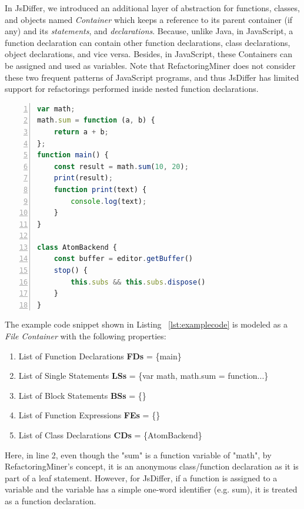 \documentclass[letterpaper,12pt,onecolumn,final]{report}
\begin{document}
In JsDiffer, we introduced an additional layer of abstraction for functions, classes, and objects named \textit{Container} which keeps a reference to its parent container (if any) and its \textit{statements}, and \textit{declarations}. Because, unlike Java, in JavaScript, a function declaration can contain other function declarations, class declarations, object declarations, and vice versa. Besides, in JavaScript, these Containers can be assigned and used as variables. Note that RefactoringMiner does not consider these two frequent patterns of JavaScript programs, and thus JsDiffer has limited support for refactorings performed inside nested function declarations.



\begin{lstlisting}[language=JavaScript, caption=Example JavaScript Code Snippet, numbers=left, label={lst:examplecode}]
var math;
math.sum = function (a, b) {
    return a + b;
};
function main() {
    const result = math.sum(10, 20);
    print(result);
    function print(text) {
        console.log(text);
    }
}

class AtomBackend {
    const buffer = editor.getBuffer()
    stop() {
        this.subs && this.subs.dispose()
    }
}
\end{lstlisting}

The example code snippet shown in Listing ~\ref{lst:examplecode} is modeled as a \textit{File Container} with the following properties:

\begin{enumerate}
\item List of Function Declarations \textbf{FDs} = \{main\}
\item List of Single Statements \textbf{LSs} = \{var math, math.sum = function...\}
\item List of Block Statements \textbf{BSs} = \{\}
\item List of Function Expressions \textbf{FEs} = \{\}
\item List of Class Declarations \textbf{CDs} = \{AtomBackend\}
\end{enumerate}

Here, in line 2, even though the "sum" is a function variable of "math", by RefactoringMiner's concept, it is an anonymous class/function declaration as it is part of a leaf statement. However, for JsDiffer, if a function is assigned to a variable and the variable has a simple one-word identifier (e.g. sum), it is treated as a function declaration.
\end{document}
